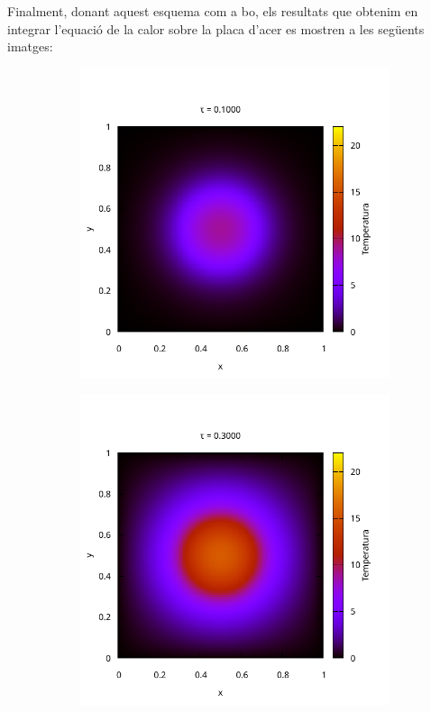 \documentclass[10pt,a4paper]{article}
\theoremstyle{definition}
\theoremstyle{remark}
\begin{document}
Finalment, donant aquest esquema com a bo, els resultats que obtenim en integrar l'equació de la calor sobre la placa d'acer es mostren a les següents imatges:
\begin{figure}[ht]
  \centering\vspace{-1cm}
  \begin{subfigure}{0.49\linewidth}
    \centering
    \includegraphics[width=\textwidth]{../plot/Images/heatmap_00010.pdf}
  \end{subfigure}\hfill
  \begin{subfigure}{0.49\linewidth}
    \centering
    \includegraphics[width=\textwidth]{../plot/Images/heatmap_00030.pdf}

\end{subfigure}
\end{figure}
\end{document}
